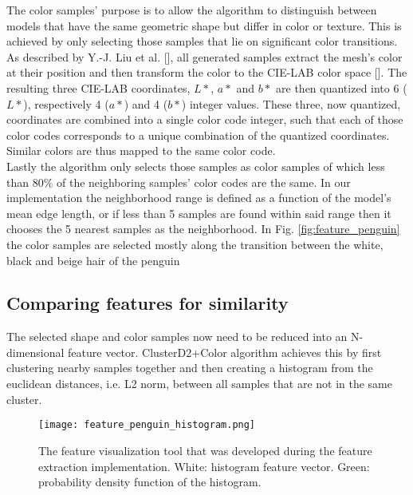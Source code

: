 The color samples' purpose is to allow the algorithm to distinguish between models that have the same geometric shape but differ in
color or texture. This is achieved by only selecting those samples that lie on significant color transitions. As described by
Y.-J. Liu et al. [], all generated samples extract the mesh's color at their position and then transform
the color to the CIE-LAB color space []. The resulting three CIE-LAB coordinates, $L*$, $a*$ and $b*$ are then
quantized into 6 ($L*$), respectively 4 ($a*$) and 4 ($b*$) integer values. These three, now quantized, coordinates are combined into a single color code integer, such that each of those color codes corresponds to a unique combination of the quantized coordinates. Similar colors are thus mapped to the same color code.\\
Lastly the algorithm only selects those samples as color samples of which less than $80\%$ of the neighboring samples' color codes are the same. In our implementation the neighborhood range is defined as a function of the model's mean edge length, or if less than 5 samples are found within said range then it chooses the 5 nearest samples as the neighborhood. In Fig. \ref{fig:feature_penguin} the
color samples are selected mostly along the transition between the white, black and beige hair of the penguin

\subsection{Comparing features for similarity}

The selected shape and color samples now need to be reduced into an N-dimensional feature vector. ClusterD2+Color algorithm achieves this by first clustering nearby samples together and then
creating a histogram from the euclidean distances, i.e. L2 norm, between all samples that are not in the same cluster.\\

\begin{wrapfigure}{R}{0.3\textwidth}
\texttt{[image: feature\_penguin\_histogram.png]}
\caption{The feature visualization tool that was developed during the feature extraction implementation. White: histogram feature vector. Green: probability density function of the histogram.}
\label{fig:feature_penguin_histogram}
\end{wrapfigure}

